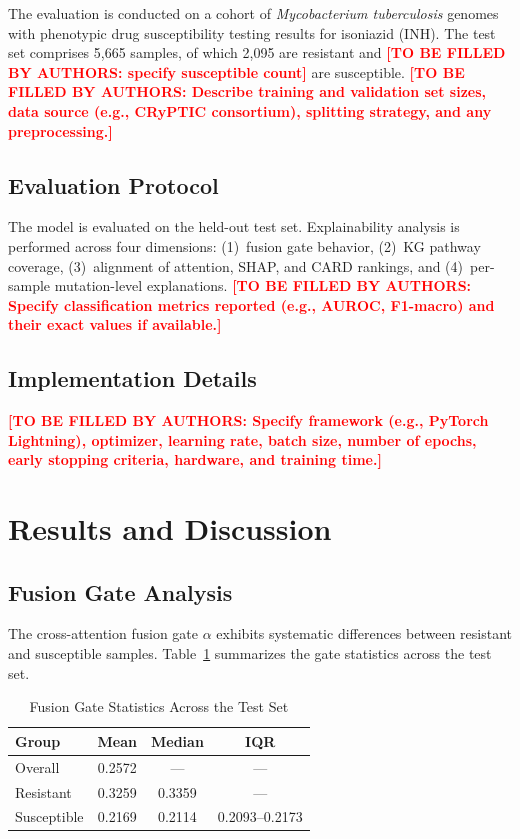 \documentclass[conference]{IEEEtran}
\newcommand{\tbd}[1]{\textcolor{red}{\textbf{[TO BE FILLED BY AUTHORS: #1]}}}
\begin{document}
The evaluation is conducted on a cohort of \textit{Mycobacterium tuberculosis} genomes with phenotypic drug susceptibility testing results for isoniazid (INH). The test set comprises 5{,}665 samples, of which 2{,}095 are resistant and \tbd{specify susceptible count} are susceptible. \tbd{Describe training and validation set sizes, data source (e.g., CRyPTIC consortium), splitting strategy, and any preprocessing.}

\subsection{Evaluation Protocol}

The model is evaluated on the held-out test set. Explainability analysis is performed across four dimensions: (1)~fusion gate behavior, (2)~KG pathway coverage, (3)~alignment of attention, SHAP, and CARD rankings, and (4)~per-sample mutation-level explanations. \tbd{Specify classification metrics reported (e.g., AUROC, F1-macro) and their exact values if available.}

\subsection{Implementation Details}

\tbd{Specify framework (e.g., PyTorch Lightning), optimizer, learning rate, batch size, number of epochs, early stopping criteria, hardware, and training time.}

\section{Results and Discussion}

\subsection{Fusion Gate Analysis}

The cross-attention fusion gate $\alpha$ exhibits systematic differences between resistant and susceptible samples. Table~\ref{tab:gate} summarizes the gate statistics across the test set.

\begin{table}[t]
\centering
\caption{Fusion Gate Statistics Across the Test Set}
\label{tab:gate}
\begin{tabular}{lccc}
\toprule
\textbf{Group} & \textbf{Mean} & \textbf{Median} & \textbf{IQR} \\
\midrule
Overall       & 0.2572 & ---    & ---             \\
Resistant     & 0.3259 & 0.3359 & ---             \\
Susceptible   & 0.2169 & 0.2114 & 0.2093--0.2173  \\
\bottomrule
\end{tabular}
\end{table}
\end{document}
